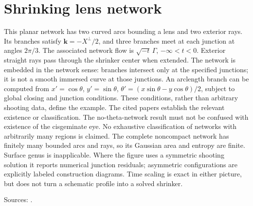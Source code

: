 \chapter{Shrinking lens network}\label{sec:catalogue-network-lens}
\begin{example}\label{ex:catalogue-network-lens}
This planar network has two curved arcs bounding a lens and two exterior rays. Its branches satisfy $\mathbf k=-X^\perp/2$, and three branches meet at each junction at angles $2\pi/3$. The associated network flow is $\sqrt{-t}\,\Gamma$, $-\infty<t<0$. Exterior straight rays pass through the shrinker center when extended. The network is embedded in the network sense: branches intersect only at the specified junctions; it is not a smooth immersed curve at those junctions.
An arclength branch can be computed from $x'=\cos\theta$, $y'=\sin\theta$, $\theta'=(x\sin\theta-y\cos\theta)/2$, subject to global closing and junction conditions. These conditions, rather than arbitrary shooting data, define the example. The cited papers establish the relevant existence or classification. The no-theta-network result must not be confused with existence of the cisgeminate eye. No exhaustive classification of networks with arbitrarily many regions is claimed.
The complete noncompact network has finitely many bounded arcs and rays, so its Gaussian area and entropy are finite. Surface genus is inapplicable. Where the figure uses a symmetric shooting solution it reports numerical junction residuals; asymmetric configurations are explicitly labeled construction diagrams. Time scaling is exact in either picture, but does not turn a schematic profile into a solved shrinker.
\par Sources: \cite{CatChang2026,CatChenGuo2007}.
\end{example}


